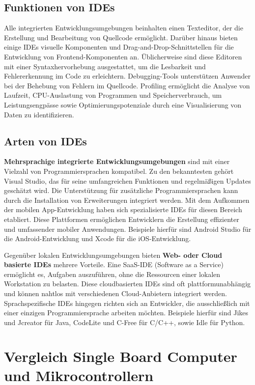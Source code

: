 \subsection{Funktionen von IDEs}
Alle integrierten Entwicklungsumgebungen beinhalten einen Texteditor, der die Erstellung und Bearbeitung von Quellcode ermöglicht. Darüber hinaus bieten einige IDEs visuelle Komponenten und Drag-and-Drop-Schnittstellen für die Entwicklung von Frontend-Komponenten an. Üblicherweise sind diese Editoren mit einer Syntaxhervorhebung ausgestattet, um die Lesbarkeit und Fehlererkennung im Code zu erleichtern. Debugging-Tools unterstützen Anwender bei der Behebung von Fehlern im Quellcode. Profiling ermöglicht die Analyse von Laufzeit, CPU-Auslastung von Programmen und Speicherverbrauch, um Leistungsengpässe sowie Optimierungspotenziale durch eine Visualisierung von Daten zu identifizieren. 

\subsection{Arten von IDEs}
\textbf{Mehrsprachige integrierte Entwicklungsumgebungen} sind mit einer Vielzahl von Programmiersprachen kompatibel. Zu den bekanntesten gehört Visual Studio, das für seine umfangreichen Funktionen und regelmäßigen Updates geschätzt wird. Die Unterstützung für zusätzliche Programmiersprachen kann durch die Installation von Erweiterungen integriert werden. Mit dem Aufkommen der mobilen App-Entwicklung haben sich spezialisierte IDEs für diesen Bereich etabliert. Diese Plattformen ermöglichen Entwicklern die Erstellung effizienter und umfassender mobiler Anwendungen. Beispiele hierfür sind Android Studio für die Android-Entwicklung und Xcode für die iOS-Entwicklung.

Gegenüber lokalen Entwicklungsumgebungen bieten \textbf{Web- oder Cloud basierte IDEs} mehrere Vorteile. Eine SaaS-IDE (Software as a Service) ermöglicht es, Aufgaben auszuführen, ohne die Ressourcen einer lokalen Workstation zu belasten. Diese cloudbasierten IDEs sind oft plattformunabhängig und können nahtlos mit verschiedenen Cloud-Anbietern integriert werden.
Sprachspezifische IDEs hingegen richten sich an Entwickler, die ausschließlich mit einer einzigen Programmiersprache arbeiten möchten. Beispiele hierfür sind Jikes und Jcreator für Java, CodeLite und C-Free für C/C++, sowie Idle für Python. \parencite{integrierteEntwicklungsumgebung}


\newpage
\section{Vergleich Single Board Computer und Mikrocontrollern}
